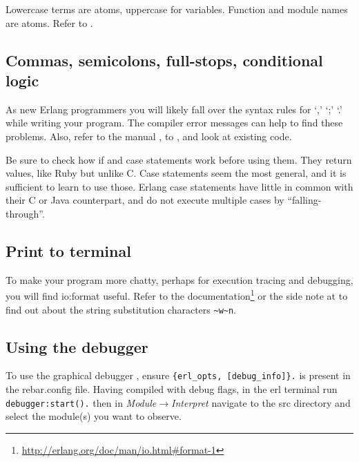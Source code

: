 \documentclass[a4paper]{article}
\begin{document}
Lowercase terms are atoms, uppercase for variables. Function and module names
are atoms. Refer to \cite{manual_expressions}.


\subsection{Commas, semicolons, full-stops, conditional logic} %
\label{sub:commas_semicolons_full_stops}

As new Erlang programmers you will likely fall over the syntax rules for `,'
`;' `.' while writing your program. The compiler error messages can help to
find these problems. Also, refer to the manual \cite{manual_functions}, to
\cite{lyse_function_syntax}, and look at existing code.

Be sure to check how if and case statements work before using them. They
return values, like Ruby but unlike C. Case statements seem the most general,
and it is sufficient to learn to use those. Erlang case statements have little
in common with their C or Java counterpart, and do not execute multiple
cases by ``falling-through''.


\subsection{Print to terminal} %
\label{sub:debug_printing}

To make your program more chatty, perhaps for execution tracing and debugging,
you will find io:format useful. Refer to
the documentation\footnote{\url{http://erlang.org/doc/man/io.html\#format-1}}
or the side note at \cite{lyse_function_syntax} to
find out about the string substitution characters \verb!~w~n!.


\subsection{Using the debugger} %
\label{sub:using_the_debugger}

To use the graphical debugger \cite{manual_debugger}, ensure
\verb!{erl_opts, [debug_info]}.! is present in the rebar.config file.
Having compiled with debug flags, in the erl terminal run \verb!debugger:start().!
then in \emph{Module$\rightarrow$Interpret} navigate to the src directory and select the
module(s) you want to observe.
\end{document}
